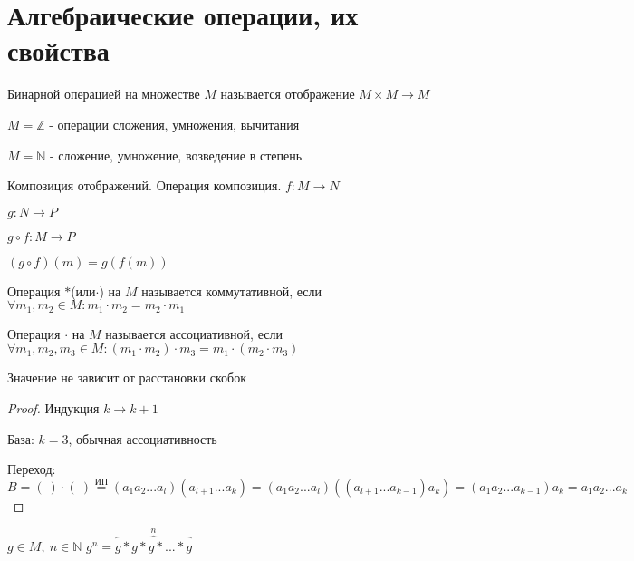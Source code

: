 
\section{Алгебраические операции, их свойства}
\begin{conj}
    Бинарной операцией на множестве $M$ называется отображение $M\times M \to M$
\end{conj}

$M=\mathbb{Z}$ - операции сложения, умножения, вычитания

$M=\mathbb{N}$ - сложение, умножение, возведение в степень

\begin{conj}
Композиция отображений. Операция композиция. $f: M \to N$

$g: N\to P$

$g\circ f: M \to P$

$(g\circ f)(m) = g(f(m))$
\end{conj}
\begin{conj}
    Операция $*$(или$\cdot$) на $M$ называется коммутативной, если $\forall m_1, m_2 \in M : m_1\cdot m_2 = m_2\cdot m_1$
\end{conj}
\begin{conj}
    Операция $\cdot$ на $M$ называется ассоциативной, если $\forall m_1, m_2, m_3 \in M: (m_1\cdot m_2)\cdot m_3 = m_1\cdot(m_2\cdot m_3)$
\end{conj}
\begin{theorem-non}
Значение не зависит от расстановки скобок
\end{theorem-non}
\begin{proof}
Индукция $k \to k+1$

База: $k=3$, обычная ассоциативность

Переход: $B = (\ )\cdot(\ ) \overset{\text{ИП}}{=} (a_1a_2...a_l)(a_{l+1}...a_k) = (a_1a_2...a_l)((a_{l+1}...a_{k-1})a_k) = (a_1a_2...a_{k-1})a_k = a_1a_2...a_k$
\end{proof}
\begin{conj}
    $g \in M,\ n \in \mathbb{N}$ $g^n=\overbrace{g*g*g*...*g}^n$
\end{conj}

